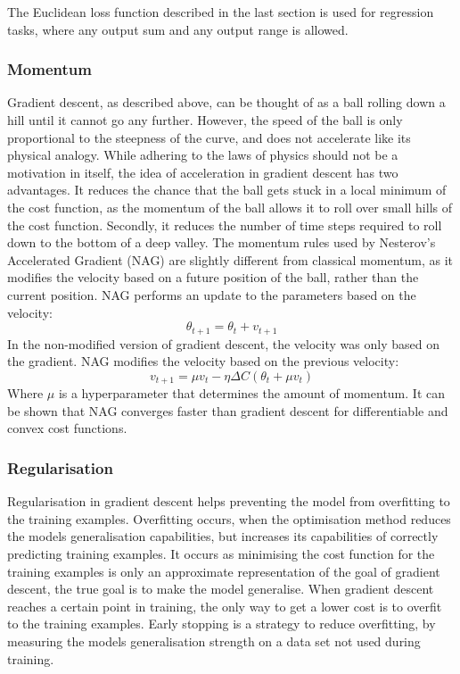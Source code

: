 The Euclidean loss function described in the last section is used for regression tasks, where any output sum and any output range is allowed.


\subsubsection{Momentum}
Gradient descent, as described above, can be thought of as a ball rolling down a hill until it cannot go any further. However, the speed of the ball is only proportional to the steepness of the curve, and does not accelerate like its physical analogy. While adhering to the laws of physics should not be a motivation in itself, the idea of acceleration in gradient descent has two advantages. It reduces the chance that the ball gets stuck in a local minimum of the cost function, as the momentum of the ball allows it to roll over small hills of the cost function. Secondly, it reduces the number of time steps required to roll down to the bottom of a deep valley. The momentum rules used by Nesterov's Accelerated Gradient (NAG) are slightly different from classical momentum, as it modifies the velocity based on a future position of the ball, rather than the current position. NAG performs an update to the parameters based on the velocity:
$$\theta_{t+1} = \theta_t + v_{t+1}$$
In the non-modified version of gradient descent, the velocity was only based on the gradient. NAG modifies the velocity based on the previous velocity:
$$v_{t+1} = \mu v_t - \eta \Delta C(\theta_t + \mu v_t)$$
Where $\mu$ is a hyperparameter that determines the amount of momentum. It can be shown that NAG converges faster than gradient descent for differentiable and convex cost functions.

\subsubsection{Regularisation}
\label{sec:regularisation}
Regularisation in gradient descent helps preventing the model from overfitting to the training examples. Overfitting occurs, when the optimisation method reduces the models generalisation capabilities, but increases its capabilities of correctly predicting training examples. It occurs as minimising the cost function for the training examples is only an approximate representation of the goal of gradient descent,  the true goal is to make the model generalise. When gradient descent reaches a certain point in training, the only way to get a lower cost is to overfit to the training examples. Early stopping is a strategy to reduce overfitting, by measuring the models generalisation strength on a data set not used during training.

